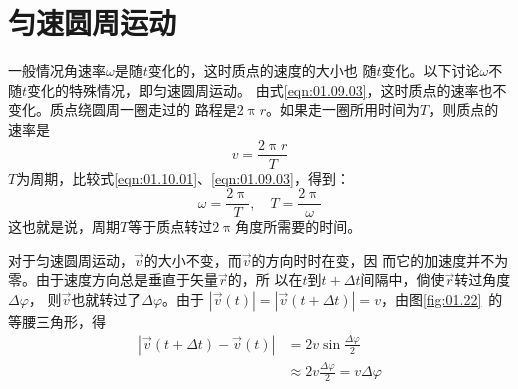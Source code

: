 \documentclass[../outline-of-mechanics.tex]{subfiles}
\begin{document}
\section{匀速圆周运动}\label{sec:01.10}

一般情况角速率$\omega$是随$t$变化的，这时质点的速度的大小也
随$t$变化。以下讨论$\omega$不随$t$变化的特殊情况，即匀速圆周运动。
由式\eqref{eqn:01.09.03}，这时质点的速率也不变化。质点绕圆周一圈走过的
路程是$2\uppi r$。如果走一圈所用时间为$T$，则质点的速率是
\begin{equation}\label{eqn:01.10.01}
  v=\frac{2 \uppi r}{T}
\end{equation}
$T$为周期，比较式\eqref{eqn:01.10.01}、\eqref{eqn:01.09.03}，得到：
\begin{equation}\label{eqn:01.10.02}
  \omega=\frac{2 \uppi}{T}, \quad T=\frac{2 \uppi}{\omega}
\end{equation}
这也就是说，周期$T$等于质点转过$2\uppi$角度所需要的时间。

对于匀速圆周运动，$\vec{v}$的大小不变，而$\vec{v}$的方向时时在变，因
而它的加速度并不为零。由于速度方向总是垂直于矢量$\vec{r}$的，所
以在$t$到$t+\Delta t$间隔中，倘使$\vec{r}$转过角度$\Delta\varphi$，
则$\vec{v}$也就转过了$\Delta\varphi$。由于
$|\vec{v}\left(t\right)|=|\vec{v}\left(t+\Delta t\right)|=v$，由图\ref{fig:01.22}~的等腰三角形，得
\begin{equation*}
  \begin{aligned}
    |\vec{v}\left(t+\Delta t\right)-\vec{v}\left(t\right)| & =2 v \sin \frac{\Delta \varphi}{2}                   \\
                                                           & \approx 2 v\frac{\Delta \varphi}{2}=v \Delta \varphi
  \end{aligned}
\end{equation*}
\end{document}
